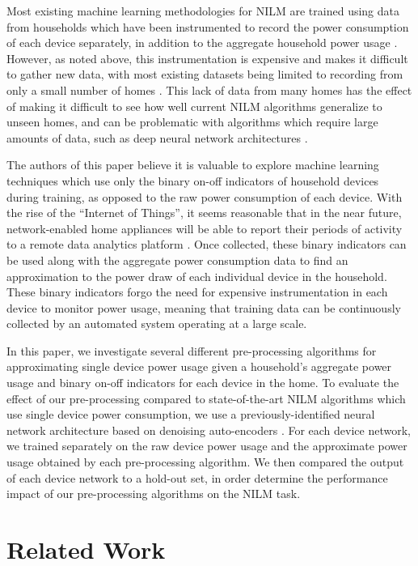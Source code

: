 \documentclass{article}
\begin{document}
Most existing machine learning methodologies for NILM are trained using data from households which have been instrumented to record the power consumption of each device separately, in addition to the aggregate household power usage \cite{Kelly, Cicchetti}.
However, as noted above, this instrumentation is expensive and makes it difficult to gather new data, with most existing datasets being limited to recording from only a small number of homes \cite{Redd, Kelly2}.
This lack of data from many homes has the effect of making it difficult to see how well current NILM algorithms generalize to unseen homes, and can be problematic with algorithms which require large amounts of data, such as deep neural network architectures \cite{Kelly}.

The authors of this paper believe it is valuable to explore machine learning techniques which use only the binary on-off indicators of household devices during training, as opposed to the raw power consumption of each device.
With the rise of the ``Internet of Things'', it seems reasonable that in the near future, network-enabled home appliances will be able to report their periods of activity to a remote data analytics platform \cite{Gubbi}.
Once collected, these binary indicators can be used along with the aggregate power consumption data to find an approximation to the power draw of each individual device in the household.
These binary indicators forgo the need for expensive instrumentation in each device to monitor power usage, meaning that training data can be continuously collected by an automated system operating at a large scale.

In this paper, we investigate several different pre-processing algorithms for approximating single device power usage given a household's aggregate power usage and binary on-off indicators for each device in the home.
To evaluate the effect of our pre-processing compared to state-of-the-art NILM algorithms which use single device power consumption, we use a previously-identified neural network architecture based on denoising auto-encoders \cite{Kelly}.
For each device network, we trained separately on the raw device power usage and the approximate power usage obtained by each pre-processing algorithm.
We then compared the output of each device network to a hold-out set, in order determine the performance impact of our pre-processing algorithms on the NILM task.

\section{Related Work}
\end{document}
